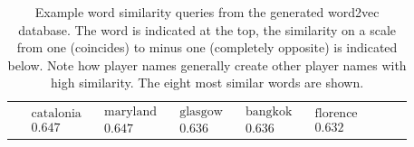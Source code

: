 \documentclass[10pt, a4paper]{UUThesisTemplate}
\begin{document}
\begin{table}[hb]
\begin{tabular}{r|c c c c c c c c}
 & $\begin{matrix}\text{catalonia}\\0.647\end{matrix}$
 & $\begin{matrix}\text{maryland}\\0.647\end{matrix}$
 & $\begin{matrix}\text{glasgow}\\0.636\end{matrix}$
 & $\begin{matrix}\text{bangkok}\\0.636\end{matrix}$
 & $\begin{matrix}\text{florence}\\0.632\end{matrix}$
 \end{tabular}
\caption{Example word similarity queries from the generated word2vec database. The word is indicated at the top, the similarity on a scale from one (coincides) to minus one (completely opposite) is indicated below. Note how player names generally create other player names with high similarity. The eight most similar words are shown.}\label{tab:moresim}
\end{table}
\end{document}
